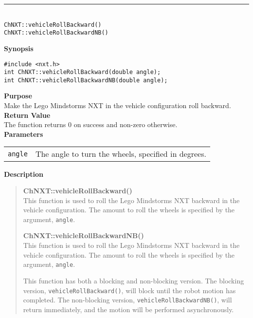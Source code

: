 \noindent
\vspace{5pt}
\rule{4.5in}{0.015in}\\
\noindent
{\LARGE \texttt{ChNXT::vehicleRollBackward()}}\\
{\LARGE \texttt{ChNXT::vehicleRollBackwardNB()}}\\
{}

\noindent
{\bf Synopsis}
\begin{lstlisting}
#include <nxt.h>
int ChNXT::vehicleRollBackward(double angle);
int ChNXT::vehicleRollBackwardNB(double angle);
\end{lstlisting}

\noindent
{\bf Purpose}\\
Make the Lego Mindstorms NXT in the vehicle configuration roll backward.\\

\noindent
{\bf Return Value}\\
The function returns 0 on success and non-zero otherwise.\\

\noindent
{\bf Parameters}\\
\vspace{-0.1in}
\begin{description}
\item               
\begin{tabular}{p{15 mm}p{145 mm}}
\texttt{angle} & The angle to turn the wheels, specified in degrees.\\
\end{tabular}
\end{description}

\noindent
{\bf Description}\\
\vspace{-12pt}
\begin{quote}
{\bf ChNXT::vehicleRollBackward()}\\
This function is used to roll the Lego Mindstorms NXT backward in the vehicle
configuration. The amount to roll the wheels is specified by the argument,
\texttt{angle}.

{\bf ChNXT::vehicleRollBackwardNB()}\\
This function is used to roll the Lego Mindstorms NXT backward in the vehicle
configuration. The amount to roll the wheels is specified by the argument,
\texttt{angle}.

This function has both a blocking and non-blocking version.
The blocking version, \texttt{vehicleRollBackward()}, will block until the
robot motion has completed. The non-blocking version, \texttt{vehicleRollBackwardNB()},
will return immediately, and the motion will be performed asynchronously.\\
\end{quote}

